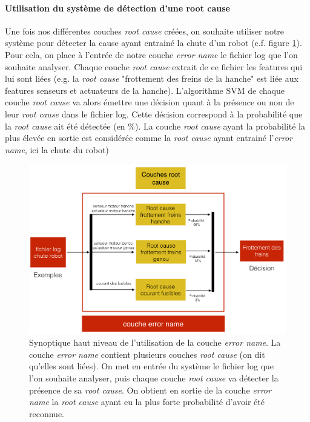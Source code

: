 \paragraph{Utilisation du système de détection d'une root cause}
Une fois nos différentes couches \emph{root cause} créées, on souhaite utiliser notre système pour détecter la cause ayant entrainé la chute d'un robot (c.f. figure \ref{fig:utilisation de la couche error name}). Pour cela, on place à l'entrée de notre couche \emph{error name} le fichier log que l'on souhaite analyser. Chaque couche \emph{root cause} extrait de ce fichier les features qui lui sont liées (e.g. la \emph{root cause} "frottement des freins de la hanche" est liée aux features senseurs et actuateurs de la hanche). L'algorithme SVM de chaque couche \emph{root cause} va alors émettre une décision quant à la présence ou non de leur \emph{root cause} dans le fichier log. Cette décision correspond à la probabilité que la \emph{ root cause} ait été détectée (en \%). La couche \emph{root cause} ayant la probabilité la plus élevée en sortie est considérée comme la \emph{root cause} ayant entrainé l'\emph{error name},  ici la chute du robot) 

\begin{figure}[h]
	\centering\includegraphics[width=12cm]{images/synoptique_error.png}
	\caption[Utilisation de la couche error name]{Synoptique haut niveau de l'utilisation de la couche \emph{error name}. La couche \emph{error name} contient plusieurs couches \emph{root cause} (on dit qu'elles sont liées). On met en entrée du système le fichier log que l'on souhaite analyser, puis chaque couche \emph{root cause} va détecter la présence de sa \emph{root cause}. On obtient en sortie de la couche \emph{error name} la \emph{root cause}  ayant eu la plus forte probabilité d'avoir été reconnue.}
	\label{fig:utilisation de la couche error name}
\end{figure}

